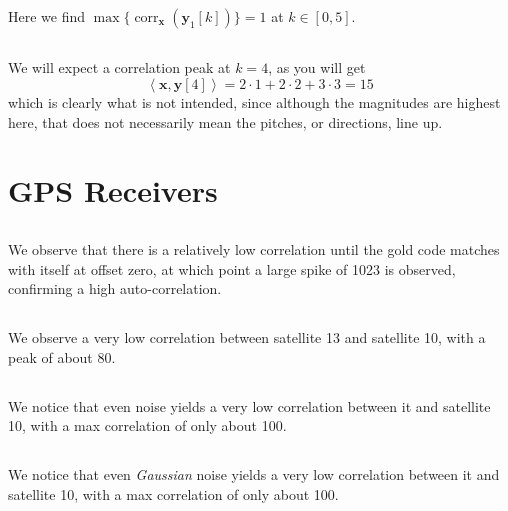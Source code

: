 \documentclass[]{article}
\newcommand{\iprod}[2]{\left\langle #1, #2 \right\rangle}
\renewcommand{\vec}[1]{\mathbf{#1}}
\newcommand{\corr}{\operatorname{corr}}
\begin{document}
Here we find \(\max\{\corr_{\vec{x}}(\vec{y}_1[k])\} = 1\) at \(k \in [0, 5]\). 

\subsection{}

We will expect a correlation peak at \(k = 4\), as you will get
\begin{equation}
	\iprod{\vec{x}}{\vec{y}[4]} = 2 \cdot 1 + 2 \cdot 2 + 3 \cdot 3 = 15
\end{equation}
which is clearly what is not intended, since although the magnitudes are highest here, that does not necessarily mean the pitches, or directions,  line up.


\section{GPS Receivers}

\subsection{}

We observe that there is a relatively low correlation until the gold code matches with itself at offset zero, at which point a large spike of 1023 is observed, confirming a high auto-correlation. 

\subsection{}

We observe a very low correlation between satellite 13 and satellite 10, with a peak of about 80. 

\subsection{}

We notice that even noise yields a very low correlation between it and satellite 10, with a max correlation of only about 100. 

\subsection{}

We notice that even \emph{Gaussian} noise yields a very low correlation between it and satellite 10, with a max correlation of only about 100. 
\end{document}
